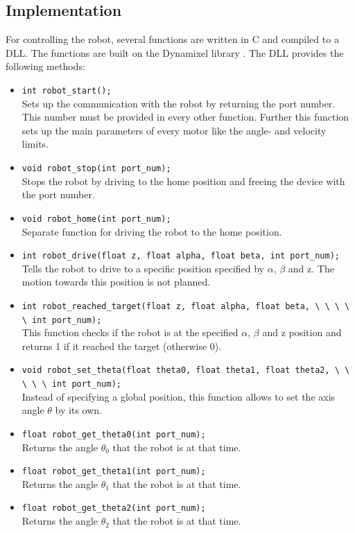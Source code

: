 \documentclass[./\jobname.tex]{subfiles}
\begin{document}
\subsection{Implementation}
For controlling the robot, several functions are written in C and compiled to a DLL. The functions are built on the Dynamixel library \cite{Robotis2019}. The DLL provides the following methods: 
\begin{itemize}
	\item \colorbox{light-gray}{\lstinline[basicstyle=\ttfamily\color{black}]|int robot_start();|} \\
	Sets up the communication with the robot by returning the port number. This number must be provided in every other function. Further this function sets up the main parameters of every motor like the angle- and velocity limits.
	\item \colorbox{light-gray}{\lstinline[basicstyle=\ttfamily\color{black}]|void robot_stop(int port_num);|} \\ 
	Stops the robot by driving to the home position and freeing the device with the port number. 
	\item \colorbox{light-gray}{\lstinline[basicstyle=\ttfamily\color{black}]|void robot_home(int port_num);|} \\
	Separate function for driving the robot to the home position. 
	\item \colorbox{light-gray}{\lstinline[basicstyle=\ttfamily\color{black}]|int robot_drive(float z, float alpha, float beta, int port_num);|} \\
	Tells the robot to drive to a specific position specified by $\alpha$, $\beta$ and z. The motion towards this position is not planned. 
	\item \colorbox{light-gray}{\lstinline[basicstyle=\ttfamily\color{black}]|int robot_reached_target(float z, float alpha, float beta, \ \ \ \ \ int port_num);|} \\
	This function checks if the robot is at the specified $\alpha$, $\beta$ and z position and returns 1 if it reached the target (otherwise 0).
	\item \colorbox{light-gray}{\lstinline[basicstyle=\ttfamily\color{black}]|void robot_set_theta(float theta0, float theta1, float theta2, \ \ \ \ \ int port_num);|} \\
	Instead of specifying a global position, this function allows to set the axis angle $\theta$ by its own. 
	\item \colorbox{light-gray}{\lstinline[basicstyle=\ttfamily\color{black}]|float robot_get_theta0(int port_num);|} \\
	Returns the angle $\theta_0$ that the robot is at that time.
	\item \colorbox{light-gray}{\lstinline[basicstyle=\ttfamily\color{black}]|float robot_get_theta1(int port_num);|} \\
	Returns the angle $\theta_1$ that the robot is at that time.
	\item \colorbox{light-gray}{\lstinline[basicstyle=\ttfamily\color{black}]|float robot_get_theta2(int port_num);|} \\ 
	Returns the angle $\theta_2$ that the robot is at that time.
\end{itemize}
\end{document}
